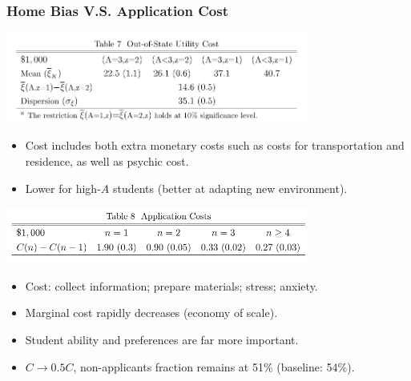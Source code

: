 \documentclass[10pt]{beamer}
\begin{document}
\begin{frame}[c]\frametitle{Home Bias V.S. Application Cost}

\centerline{\includegraphics[width=0.75\textwidth]{table7.png}}
\begin{itemize}
    \small
    \item  Cost includes both extra monetary costs such as costs for transportation and residence, as well as psychic cost.
    \item  Lower for high-$A$ students (better at adapting new environment).
\end{itemize}

\centerline{\includegraphics[width=0.75\textwidth]{table8.png}}
\begin{itemize}
    \small
    \item Cost: collect information; prepare materials; stress; anxiety.
    \item Marginal cost rapidly decreases (economy of scale).
    \item Student ability and preferences are far more important.
    \item $C\to 0.5C$, non-applicants fraction remains at 51\% (baseline: 54\%).
\end{itemize}

\end{frame}
\end{document}
